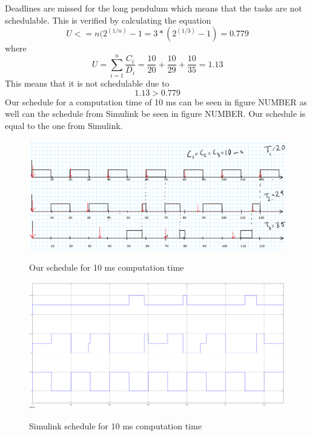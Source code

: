 \documentclass[12pt,a4paper]{article}
\begin{document}
    
Deadlines are missed for the long pendulum which means that the tasks are not schedulable. This is verified by calculating the equation
\begin{equation}
 U <= n(2^{(1/n)}-1 = 3*(2^{(1/3)}-1) = 0.779
\end{equation}
where
\begin{equation}
U = \sum\limits_{i=1}^n \frac{C_i}{D_i} = \frac{10}{20}+\frac{10}{29}+\frac{10}{35} = 1.13
\end{equation}
This means that it is not schedulable due to
\begin{equation}
1.13 > 0.779
\end{equation} 
Our schedule for a computation time of 10 ms can be seen in figure NUMBER as well can the schedule from Simulink be seen in figure NUMBER. Our schedule is equal to the one from Simulink.
\begin{center}
	\begin{figure}[H]
      \centering
	\includegraphics[scale=0.3]{ex541.png}
	\label{fig:ex541}
	\caption{Our schedule for 10 ms computation time}
	\end{figure}
\end{center}
\begin{center}
	\begin{figure}[H]
      \centering
	\includegraphics[scale=0.2]{ex542.png}
	\label{fig:ex541}
	\caption{Simulink schedule for 10 ms computation time}
	\end{figure}
\end{center}
\end{document}
